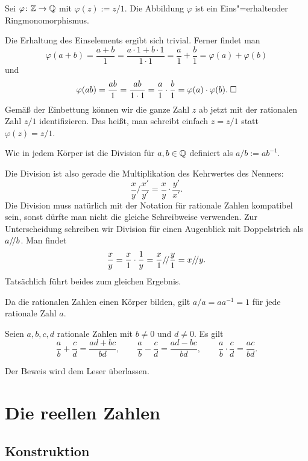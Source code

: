 \newpage
\begin{Satz}\newlinefirst
Sei $\varphi\colon\mathbb Z\to\mathbb Q$ mit $\varphi(z):=z/1$. Die
Abbildung $\varphi$ ist ein Eins"=erhaltender Ringmonomorphismus.
\end{Satz}
 Die Erhaltung des Einselements ergibt sich
trivial. Ferner findet man
\[\varphi(a+b) = \frac{a+b}{1} = \frac{a\cdot 1+b\cdot 1}{1\cdot 1}
= \frac{a}{1}+\frac{b}{1} = \varphi(a)+\varphi(b)\]
und
\[\varphi(ab) = \frac{ab}{1} = \frac{ab}{1\cdot 1} = \frac{a}{1}\cdot\frac{b}{1}
= \varphi(a)\cdot\varphi(b).\;\Box\]
Gemäß der Einbettung können wir die ganze Zahl $z$ ab jetzt
mit der rationalen Zahl $z/1$ identifizieren. Das heißt, man schreibt
einfach $z=z/1$ statt $\varphi(z)=z/1$.

\begin{Definition}\newlinefirst
Wie in jedem Körper ist die Division für $a,b\in\mathbb Q$
definiert als $a/b := ab^{-1}$.
\end{Definition}
Die Division ist also gerade die Multiplikation des Kehrwertes
des Nenners:
\[\frac{x}{y}/\frac{x'}{y'} = \frac{x}{y}\cdot\frac{y'}{x'}.\]
Die Division muss natürlich mit der Notation für rationale Zahlen
kompatibel sein, sonst dürfte man nicht die gleiche Schreibweise
verwenden. Zur Unterscheidung schreiben wir Division für einen
Augenblick mit Doppelstrich als $a/\!/ b$. Man findet
\[\frac{x}{y} = \frac{x}{1}\cdot\frac{1}{y}
= \frac{x}{1}/\!/\frac{y}{1} = x/\!/ y.\]
Tatsächlich führt beides zum gleichen Ergebnis.

Da die rationalen Zahlen einen Körper bilden, gilt $a/a=aa^{-1}=1$
für jede rationale Zahl $a$.

\begin{Satz}\newlinefirst
Seien $a,b,c,d$ rationale Zahlen mit $b\ne 0$ und $d\ne 0$. Es gilt
\[\frac{a}{b}+\frac{c}{d} = \frac{ad+bc}{bd},
\qquad \frac{a}{b}-\frac{c}{d} = \frac{ad-bc}{bd},
\qquad \frac{a}{b}\cdot\frac{c}{d} = \frac{ac}{bd}.\]
\end{Satz}
Der Beweis wird dem Leser überlassen.

\newpage
\section{Die reellen Zahlen}

\subsection{Konstruktion}

